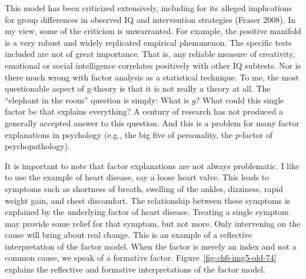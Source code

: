 \documentclass[
  a4paper,
  DIV=11,
  numbers=noendperiod,
  oneside]{scrreprt}
\begin{document}
This model has been criticized extensively, including for its alleged
implications for group differences in observed IQ and intervention
strategies (Fraser 2008). In my view, some of the criticism is
unwarranted. For example, the positive manifold is a very robust and
widely replicated empirical phenomenon. The specific tests included are
not of great importance. That is, any reliable measure of creativity,
emotional or social intelligence correlates positively with other IQ
subtests. Nor is there much wrong with factor analysis as a statistical
technique. To me, the most questionable aspect of g-theory is that it is
not really a theory at all. The ``elephant in the room'' question is
simply: What is \(g\)? What could this single factor be that explains
everything? A century of research has not produced a generally accepted
answer to this question. And this is a problem for many factor
explanations in psychology (e.g., the big five of personality, the
\(p\)-factor of psychopathology).

It is important to note that factor explanations are not always
problematic. I like to use the example of heart disease, say a loose
heart valve. This leads to symptoms such as shortness of breath,
swelling of the ankles, dizziness, rapid weight gain, and chest
discomfort. The relationship between these symptoms is explained by the
underlying factor of heart disease. Treating a single symptom may
provide some relief for that symptom, but not more. Only intervening on
the cause will bring about real change. This is an example of a
reflective interpretation of the factor model. When the factor is merely
an index and not a common cause, we speak of a formative factor.
Figure~\ref{fig-ch6-img5-old-74} explains the reflective and formative
interpretations of the factor model.
\end{document}

